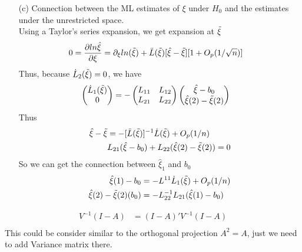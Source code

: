 \documentclass{article}
\begin{document}
\begin{itemize}
\item[(c)] Connection between the ML estimates of $\xi$ under $H_0$ and the estimates under the unrestricted space.\\
Using a Taylor's series expansion, we get expansion at $\Tilde{\xi}$
\begin{align*}
0  &= \frac{\partial ln \hat{\xi}}{\partial \xi} = \partial_{\xi} ln(\Tilde{\xi}) + \ddot{L}(\Tilde{\xi})[\hat{\xi} - \Tilde{\xi}] [1+ O_p(1/\sqrt{n})]
\end{align*} 
Thus, because $\dot{L}_2(\Tilde{\xi}) = 0$, we have
\begin{align*}
\begin{pmatrix}
        \dot{L}_1(\Tilde{\xi})\\
           0\\
         \end{pmatrix}   &= - \begin{pmatrix}
        L_{11} & L_{12}\\
          L_{21} & L_{22}\\
         \end{pmatrix} \begin{pmatrix}
         \hat{\xi} - b_0\\
         \hat{\xi}(2) - \Tilde{\xi}(2)\\
         \end{pmatrix}
\end{align*} 
Thus
\begin{align*}
\hat{\xi} - \Tilde{\xi}  &= - [\ddot{L}(\Tilde{\xi})]^{-1} \dot{L}(\Tilde{\xi}) + O_p(1/n)\\
& L_{21} (\hat{\xi} - b_0) + L_{22} (\hat{\xi}(2) - \Tilde{\xi}(2)) = 0
\end{align*} 
So we can get the connection between $\hat{\xi}_1$ and $b_0$
\begin{align*}
\hat{\xi}(1) - b_0  &= - L^{11} \dot{L}_1(\Tilde{\xi}) + O_p(1/n)\\
\hat{\xi}(2) - \Tilde{\xi}(2)(b_0) & = - L_{22}^{-1}L_{21} (\hat{\xi}(1) - b_0) 
\end{align*} 
\end{itemize}

\exercise[MVN]


\begin{align*}
V^{-1}(I-A)  &= (I-A)' V^{-1} (I-A)\\
\end{align*} 
This could be consider similar to the orthogonal projection $A^2 = A$, just we need to add Variance matrix there.
\end{document}
